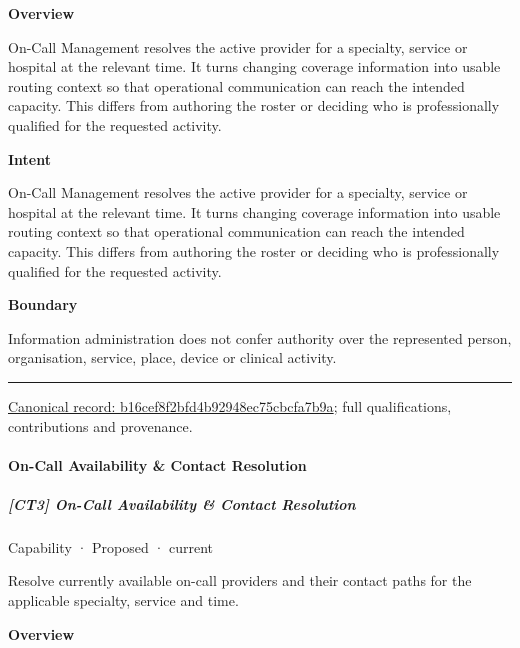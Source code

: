 \textbf{Overview}



On-Call Management resolves the active provider for a specialty, service or hospital at the relevant time. It turns changing coverage information into usable routing context so that operational communication can reach the intended capacity. This differs from authoring the roster or deciding who is professionally qualified for the requested activity.



\textbf{Intent}



On-Call Management resolves the active provider for a specialty, service or hospital at the relevant time. It turns changing coverage information into usable routing context so that operational communication can reach the intended capacity. This differs from authoring the roster or deciding who is professionally qualified for the requested activity.



\textbf{Boundary}



Information administration does not confer authority over the represented person, organisation, service, place, device or clinical activity.



\medskip\hrule\medskip

{\footnotesize \href{../../../../continuum/strategy/capability/b16cef8f2bfd4b92948ec75cbcfa7b9a.md}{Canonical record: b16cef8f2bfd4b92948ec75cbcfa7b9a}; full qualifications, contributions and provenance.}\par
\paragraph{On-Call Availability \& Contact Resolution}

\subparagraph{[CT3] On-Call Availability \& Contact Resolution}

\label{element:677a816c42414ea694791b4ee5a14285}
{\small Capability · Proposed · current}\par

Resolve currently available on-call providers and their contact paths for the applicable specialty, service and time.



\textbf{Overview}




